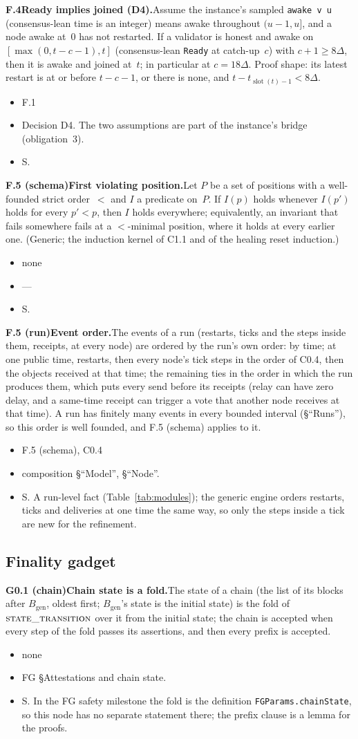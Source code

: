 \documentclass{article}
\newcommand{\genesis}{B_{\mathrm{gen}}}
\newcommand{\slot}{\operatorname{slot}}
\newcommand{\fname}[1]{\text{\textsc{#1}}}
\newcommand{\dagnode}[6]{%
\par\medskip\noindent\textbf{#1\enspace #2.}\enspace #3
\begin{itemize}[leftmargin=2.2em,itemsep=0pt,topsep=2pt]
\item[\emph{Uses}] #4
\item[\emph{Evid.}] #5
\item[\emph{Task}] #6
\end{itemize}}
\begin{document}
\dagnode{F.4}{Ready implies joined (D4)}{Assume the instance's sampled
\texttt{awake v u} (consensus-lean time is an integer) means awake throughout
$(u-1,u]$, and a node awake at~$0$ has not restarted.  If a validator is honest
and awake on $[\max(0,t-c-1),t]$ (consensus-lean \texttt{Ready} at catch-up~$c$)
with $c+1\geq8\Delta$, then it is awake and joined at~$t$; in particular at
$c=18\Delta$.  Proof shape: its latest restart is at or before $t-c-1$, or there
is none, and $t-t_{\slot(t)-1}<8\Delta$.}
{F.1}{Decision D4.  The two assumptions are part of the instance's
bridge (obligation~3).}{S.}

\dagnode{F.5 (schema)}{First violating position}{Let $P$ be a set of
positions with a well-founded strict order~$<$ and $I$ a predicate on~$P$.  If
$I(p)$ holds whenever $I(p')$ holds for every $p'<p$, then $I$ holds everywhere;
equivalently, an invariant that fails somewhere fails at a $<$-minimal position,
where it holds at every earlier one.  (Generic; the induction kernel of C1.1 and
of the healing reset induction.)}
{none}{---}{S.}

\dagnode{F.5 (run)}{Event order}{The events of a run (restarts, ticks and the
steps inside them, receipts, at every node) are ordered by the run's own order:
by time; at one public time, restarts, then every node's tick steps in the
order of C0.4, then the objects received at that time; the remaining ties in
the order in which the run produces them, which puts every send before its
receipts (relay can have zero delay, and a same-time receipt can trigger a vote
that another node receives at that time).  A run has finitely many events in
every bounded interval (\S``Runs''), so this order is well founded, and F.5
(schema) applies to it.}
{F.5 (schema), C0.4}{composition \S``Model'', \S``Node''.}{S.  A run-level fact
(Table~\ref{tab:modules}); the generic engine orders restarts, ticks and
deliveries at one time the same way, so only the steps inside a tick are new
for the refinement.}

\subsection{Finality gadget}

\dagnode{G0.1 (chain)}{Chain state is a fold}{The state of a chain (the
list of its blocks after $\genesis$, oldest first; $\genesis$'s state is the
initial state) is the fold of $\fname{state\_transition}$
over it from the initial state; the chain is accepted when every step of the
fold passes its assertions, and then every prefix is accepted.}
{none}{FG \S Attestations and chain state.}{S.  In the FG safety milestone
the fold is the definition
\texttt{FGParams.chainState}, so this node has no separate statement there;
the prefix clause is a lemma for the proofs.}
\end{document}
